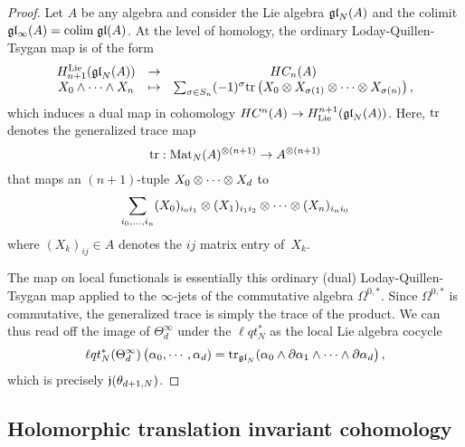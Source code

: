 \begin{proof}
Let $A$ be any algebra and consider the Lie algebra ${\mathfrak{gl}}_N(A)$ and the colimit $\mathfrak{g} \mathfrak{l}_\infty(A) = {\rm colim} \; {\mathfrak{gl}} (A)$. 
At the level of homology, the ordinary Loday-Quillen-Tsygan map is of the form
\[
\begin{array}{ccc}
H_{n+1}^{\rm Lie}({\mathfrak{gl}}_N(A)) & \to & HC_{n}(A) \\
X_0 \wedge \cdots \wedge X_n & \mapsto & \sum_{\sigma \in S_n} (-1)^{\sigma} {\rm tr} \left(X_0 \otimes X_{\sigma(1)} \otimes\cdots \otimes X_{\sigma(n)} \right), 
\end{array}
\] 
which induces a dual map in cohomology $HC^n(A) \to H^{n+1}_{\rm Lie}({\mathfrak{gl}}_N(A))$. 
Here, ${\rm tr}$ denotes the generalized trace map
\[
{\rm tr} : {\rm Mat}_N(A)^{\otimes(n+1)} \to A^{\otimes (n+1)} 
\]
that maps an $(n+1)$-tuple $X_0\otimes \cdots \otimes X_d$ to 
\[
\sum_{i_0,\ldots,i_n} (X_0)_{i_0 i_1} \otimes (X_1)_{i_1i_2} \otimes \cdots \otimes (X_n)_{i_n i_0}
\]
where $(X_k)_{ij} \in A$ denotes the $ij$ matrix entry of~$X_k$.

The map on local functionals is essentially this ordinary (dual) Loday-Quillen-Tsygan map applied to the $\infty$-jets of the commutative algebra $\Omega^{0,*}$. 
Since $\Omega^{0,*}$ is commutative, the generalized trace is simply the trace of the product.
We can thus read off the image of $\Theta^\infty_d$ under the $\ell q t_N^*$ as the local Lie algebra cocycle
\begin{align*}
\ell q t_N^*(\Theta_d^\infty)\left(\alpha_0, \cdots, \alpha_d) = {\rm tr}_{{\mathfrak{gl}}_N}(\alpha_0 \wedge \partial \alpha_1\wedge \cdots \wedge \partial \alpha_d\right),
\end{align*}
which is precisely $\mathfrak j(\theta_{d+1,N})$. 
\end{proof}

\subsection{Holomorphic translation invariant cohomology}

